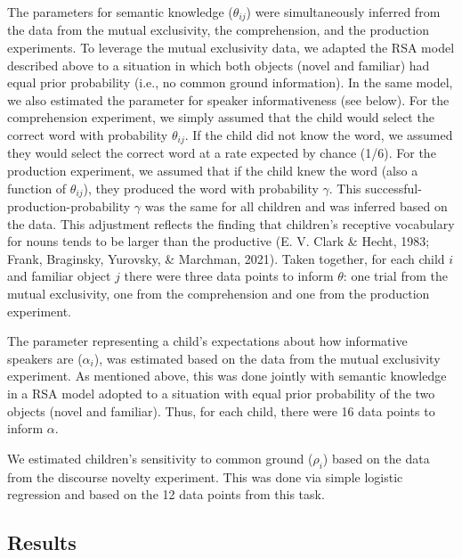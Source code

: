\documentclass[
  man,mask,floatsintext]{apa6}
\begin{document}
The parameters for semantic knowledge (\(\theta_{ij}\)) were simultaneously inferred from the data from the mutual exclusivity, the comprehension, and the production experiments. To leverage the mutual exclusivity data, we adapted the RSA model described above to a situation in which both objects (novel and familiar) had equal prior probability (i.e., no common ground information). In the same model, we also estimated the parameter for speaker informativeness (see below). For the comprehension experiment, we simply assumed that the child would select the correct word with probability \(\theta_{ij}\). If the child did not know the word, we assumed they would select the correct word at a rate expected by chance (1/6). For the production experiment, we assumed that if the child knew the word (also a function of \(\theta_{ij}\)), they produced the word with probability \(\gamma\). This successful-production-probability \(\gamma\) was the same for all children and was inferred based on the data. This adjustment reflects the finding that children's receptive vocabulary for nouns tends to be larger than the productive (E. V. Clark \& Hecht, 1983; Frank, Braginsky, Yurovsky, \& Marchman, 2021). Taken together, for each child \(i\) and familiar object \(j\) there were three data points to inform \(\theta\): one trial from the mutual exclusivity, one from the comprehension and one from the production experiment.

The parameter representing a child's expectations about how informative speakers are (\(\alpha_i\)), was estimated based on the data from the mutual exclusivity experiment. As mentioned above, this was done jointly with semantic knowledge in a RSA model adopted to a situation with equal prior probability of the two objects (novel and familiar). Thus, for each child, there were 16 data points to inform \(\alpha\).

We estimated children's sensitivity to common ground (\(\rho_i\)) based on the data from the discourse novelty experiment. This was done via simple logistic regression and based on the 12 data points from this task.

\hypertarget{results}{%
\subsection{Results}\label{results}}
\end{document}
